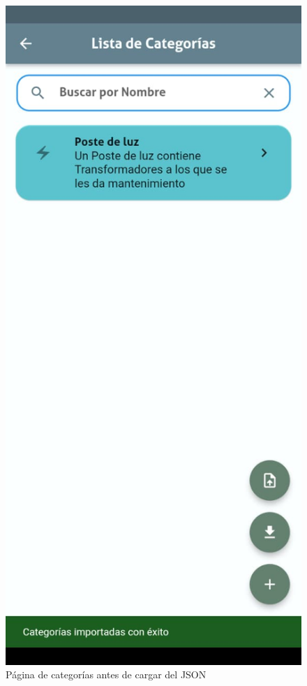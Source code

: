 \documentclass{article}
\begin{document}
\begin{figure}[H]
\begin{minipage}[b]{0.3\textwidth}
    \caption{Página de categorías antes de cargar del JSON}
    \label{fig:loadcategories1}
  \end{minipage}
  \hspace{0.02\textwidth}
  \begin{minipage}[b]{0.3\textwidth}
    \centering
    \includegraphics[width=\textwidth]{images/functionality_test/load_categories_2.jpg}

\end{minipage}
\end{figure}
\end{document}
